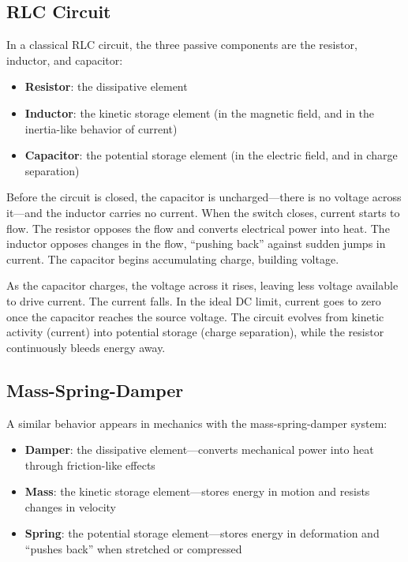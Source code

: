 \documentclass[
]{article}
\providecommand{\tightlist}{%
  \setlength{\itemsep}{0pt}\setlength{\parskip}{0pt}}
\begin{document}
\subsection{RLC Circuit}\label{rlc-circuit}

In a classical RLC circuit, the three passive components are the
resistor, inductor, and capacitor:

\begin{itemize}
\tightlist
\item
  \textbf{Resistor}: the dissipative element
\item
  \textbf{Inductor}: the kinetic storage element (in the magnetic field,
  and in the inertia-like behavior of current)
\item
  \textbf{Capacitor}: the potential storage element (in the electric
  field, and in charge separation)
\end{itemize}

Before the circuit is closed, the capacitor is uncharged---there is no
voltage across it---and the inductor carries no current. When the switch
closes, current starts to flow. The resistor opposes the flow and
converts electrical power into heat. The inductor opposes changes in the
flow, ``pushing back'' against sudden jumps in current. The capacitor
begins accumulating charge, building voltage.

As the capacitor charges, the voltage across it rises, leaving less
voltage available to drive current. The current falls. In the ideal DC
limit, current goes to zero once the capacitor reaches the source
voltage. The circuit evolves from kinetic activity (current) into
potential storage (charge separation), while the resistor continuously
bleeds energy away.

\subsection{Mass-Spring-Damper}\label{mass-spring-damper}

A similar behavior appears in mechanics with the mass-spring-damper
system:

\begin{itemize}
\tightlist
\item
  \textbf{Damper}: the dissipative element---converts mechanical power
  into heat through friction-like effects
\item
  \textbf{Mass}: the kinetic storage element---stores energy in motion
  and resists changes in velocity
\item
  \textbf{Spring}: the potential storage element---stores energy in
  deformation and ``pushes back'' when stretched or compressed
\end{itemize}
\end{document}
